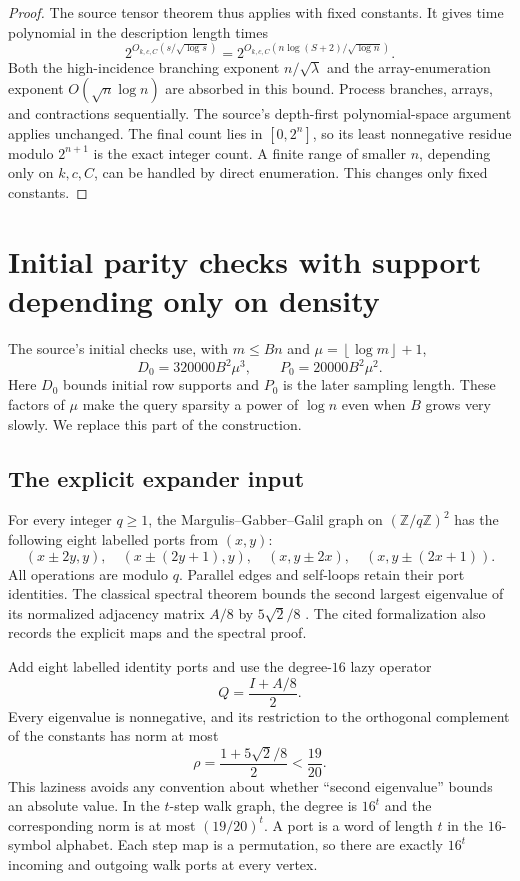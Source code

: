 \documentclass[11pt]{article}
\numberwithin{equation}{section}
\theoremstyle{definition}\newtheorem{definition}[theorem]{Definition}
\theoremstyle{remark}\newtheorem{remark}[theorem]{Remark}
\newcommand{\Z}{\mathbb Z}
\newcommand{\floor}[1]{\left\lfloor#1\right\rfloor}
\begin{document}
\begin{proof}
The source tensor theorem thus applies with fixed constants. It
gives time polynomial in the description length times
\[
 2^{O_{k,c,C}(s/\sqrt{\log s})}
  =2^{O_{k,c,C}(n\log(S+2)/\sqrt{\log n})}.
\]
Both the high-incidence branching exponent $n/\sqrt\lambda$ and
the array-enumeration exponent $O(\sqrt n\log n)$ are absorbed in
this bound. Process branches, arrays, and contractions sequentially.
The source's depth-first polynomial-space argument applies unchanged.
The final count lies in $[0,2^n]$, so its least nonnegative residue
modulo $2^{n+1}$ is the exact integer count. A finite range of smaller
$n$, depending only on $k,c,C$, can be handled by direct enumeration.
This changes only fixed constants.
\end{proof}

\section{Initial parity checks with support depending only on density}
\label{sec:checks}

The source's initial checks use, with $m\le Bn$ and
$\mu=\floor{\log m}+1$,
\[
 D_0=320000B^2\mu^3,\qquad P_0=20000B^2\mu^2.
\]
Here $D_0$ bounds initial row supports and $P_0$ is the later sampling
length. These factors of $\mu$ make the query sparsity a power of
$\log n$ even when $B$ grows very slowly. We replace this part of
the construction.

\subsection{The explicit expander input}

For every integer $q\ge1$, the Margulis--Gabber--Galil graph on
$(\Z/q\Z)^2$ has the following eight labelled ports from $(x,y)$:
\begin{equation}\label{eq:mgg}
 (x\pm2y,y),\quad(x\pm(2y+1),y),\quad
 (x,y\pm2x),\quad(x,y\pm(2x+1)).
\end{equation}
All operations are modulo $q$. Parallel edges and self-loops retain
their port identities. The classical spectral theorem bounds the
second largest eigenvalue of its normalized adjacency matrix $A/8$
by $5\sqrt2/8$ \cite{GG1981,MGGFormal}. The cited formalization
also records the explicit maps and the spectral proof.

Add eight labelled identity ports and use the degree-$16$ lazy
operator
\[
 Q=\frac{I+A/8}{2}.
\]
Every eigenvalue is nonnegative, and its restriction to the
orthogonal complement of the constants has norm at most
\begin{equation}\label{eq:rho}
 \rho=\frac{1+5\sqrt2/8}{2}<\frac{19}{20}.
\end{equation}
This laziness avoids any convention about whether ``second
eigenvalue'' bounds an absolute value. In the $t$-step walk graph,
the degree is $16^t$ and the corresponding norm is at most
$(19/20)^t$. A port is a word of length $t$ in the $16$-symbol
alphabet. Each step map is a permutation, so there are exactly
$16^t$ incoming and outgoing walk ports at every vertex.
\end{document}
